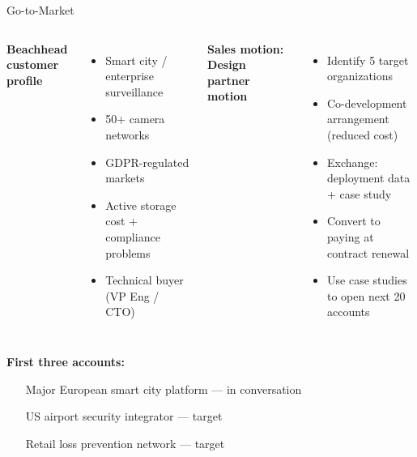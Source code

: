 \documentclass[aspectratio=169, professionalfonts, 10pt]{beamer}
\begin{document}
\begin{frame}{Go-to-Market}

  \begin{columns}[t]
    \textbf{Beachhead customer profile} \\
    \begin{itemize}
      \item Smart city / enterprise surveillance \\
      \item 50+ camera networks \\
      \item GDPR-regulated markets \\
      \item Active storage cost + compliance problems \\
      \item Technical buyer (VP Eng / CTO)
    \end{itemize}

    \textbf{Sales motion: Design partner motion} \\
    \begin{itemize}
      \item Identify 5 target organizations \\
      \item Co-development arrangement (reduced cost) \\
      \item Exchange: deployment data + case study \\
      \item Convert to paying at contract renewal \\
      \item Use case studies to open next 20 accounts
    \end{itemize}
  \end{columns}

  \vspace{0.8em}
  \textbf{First three accounts:} \\
  \begin{itemize}
    \item [Major European smart city platform] --- in conversation \\
    \item [US airport security integrator] --- target \\
    \item [Retail loss prevention network] --- target
  \end{itemize}
\end{frame}
\end{document}
